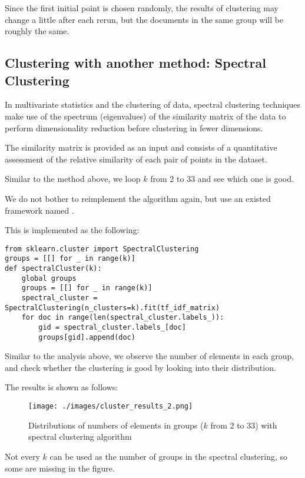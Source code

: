 \documentclass[a4paper, 12pt]{article}
\begin{document}
Since the first initial point is chosen randomly, the results of clustering may change a little after each rerun, but the documents in the same group will be roughly the same.

\subsection{Clustering with another method: Spectral Clustering}

In multivariate statistics and the clustering of data, spectral clustering techniques make use of the spectrum (eigenvalues) of the similarity matrix of the data to perform dimensionality reduction before clustering in fewer dimensions. 

The similarity matrix is provided as an input and consists of a quantitative assessment of the relative similarity of each pair of points in the dataset.

Similar to the method above, we loop $k$ from 2 to 33 and see which one is good.

We do not bother to reimplement the algorithm again, but use an existed framework named . 

This is implemented as the following:

\begin{lstlisting}[style=myPython,caption={Spectral clustering}]
from sklearn.cluster import SpectralClustering
groups = [[] for _ in range(k)]
def spectralCluster(k):
    global groups
    groups = [[] for _ in range(k)]
    spectral_cluster = SpectralClustering(n_clusters=k).fit(tf_idf_matrix)
    for doc in range(len(spectral_cluster.labels_)):
        gid = spectral_cluster.labels_[doc]
        groups[gid].append(doc)

\end{lstlisting}

Similar to the analysis above, we observe the number of elements in each group, and check whether the clustering is good by looking into their distribution.

The results is shown as follows:

\begin{figure}[htbp]
\centering
\texttt{[image: ./images/cluster\_results\_2.png]}
\caption{Distributions of numbers of elements in groups ($k$ from 2 to 33) with spectral clustering algorithm}
\end{figure}

Not every $k$ can be used as the number of groups in the spectral clustering, so some are missing in the figure.
\end{document}
